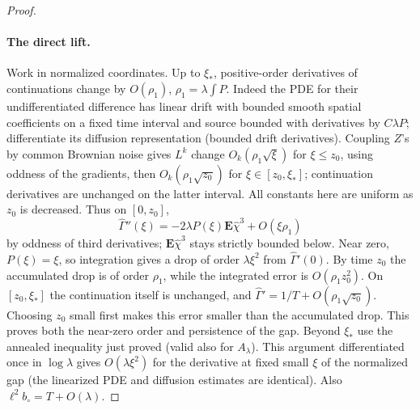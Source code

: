 \begin{proof}\leavevmode\par
\paragraph{The direct lift.} Work in normalized coordinates. Up to \(\xi_*\), positive-order derivatives of continuations change by \(O(\rho_1)\), \(\rho_1=\lambda\int P\). Indeed the PDE for their undifferentiated difference has linear drift with bounded smooth spatial coefficients on a fixed time interval and source bounded with derivatives by \(C\lambda P\); differentiate its diffusion representation (bounded drift derivatives). Coupling \(Z\)'s by common Brownian noise gives \(L^k\) change \(O_k(\rho_1\sqrt{\xi})\) for \(\xi\le z_0\), using oddness of the gradients, then \(O_k(\rho_1\sqrt{z_0})\) for \(\xi\in[z_0,\xi_*]\); continuation derivatives are unchanged on the latter interval. All constants here are uniform as \(z_0\) is decreased. Thus on \([0,z_0]\),
\[
 \widehat\Gamma''(\xi)=-2\lambda P(\xi)\mathbf E\widehat\chi^3+O(\xi\rho_1)
\]
by oddness of third derivatives; \(\mathbf E\widehat\chi^3\) stays strictly bounded below. Near zero, \(P(\xi)=\xi\), so integration gives a drop of order
\(\lambda\xi^2\) from \(\widehat\Gamma'(0)\). By time \(z_0\)
the accumulated drop is of order \(\rho_1\), while the integrated
error is \(O(\rho_1z_0^2)\). On \([z_0,\xi_*]\) the continuation
itself is unchanged, and
\(\widehat\Gamma'=1/T+O(\rho_1\sqrt{z_0})\). Choosing \(z_0\)
small first makes this error smaller than the accumulated drop. This
proves both the near-zero order and persistence of the gap. Beyond \(\xi_*\) use the annealed inequality just proved (valid also for \(A_\lambda\)). This argument differentiated once in \(\log\lambda\) gives \(O(\lambda\xi^2)\) for the derivative at fixed small \(\xi\) of the normalized gap (the linearized PDE and diffusion estimates are identical). Also \(\ell^2 b_\circ=T+O(\lambda)\).


\end{proof}
